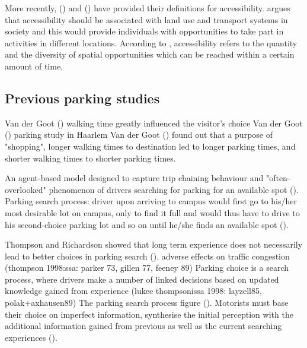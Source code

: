 More recently, \citeauthor{Geurs2004} (\citeyear{Geurs2004}) and \citeauthor{Bertolini2003} (\citeyear{Bertolini2003}) have provided their definitions for accessibility. \citeauthor{Geurs2004} argues that accessibility should be associated with land use and transport systems in society and this would provide individuals with opportunities to take part in activities in different locations. According to \cite{Bertolini2003}, accessibility refers to the quantity and the diversity of spatial opportunities which can be reached within a certain amount of time.

\newpage
\subsection{Previous parking studies}
\justify

Van der Goot (\cite{VanDerGoot1982}) walking time greatly influenced the visitor's choice
Van der Goot (\cite{VanDerGoot1982}) parking study in Haarlem
Van der Goot (\cite{VanDerGoot1982}) found out that a purpose of "shopping", longer walking times to destination led to longer parking times, and shorter walking times to shorter parking times.

An agent-based model designed to capture trip chaining behaviour and "often-overlooked" phenomenon of drivers searching for parking for an available spot (\cite{Guo2013}).
Parking search process: driver upon arriving to campus would first go to his/her most desirable lot on campus, only to find it full and would thus have to drive to his second-choice parking lot and so on until he/she finds an available spot  (\cite{Guo2013}).

Thompson and Richardson showed that long term experience does not necessarily lead to better choices in parking search (\cite{Thompson1998}).
adverse effects on traffic congestion (thompson 1998:ssa: parker 73, gillen 77, feeney 89)
Parking choice is a search process, where drivers make a number of linked decisions based on updated knowledge gained from experience (lukee thompsonissa 1998: layzell85, polak+axhausen89)
The parking search process figure (\cite{Thompson1998}).
Motorists must base their choice on imperfect information, synthesise the initial perception with the additional information gained from previous as well as the current searching experiences (\cite{Thompson1998}).

